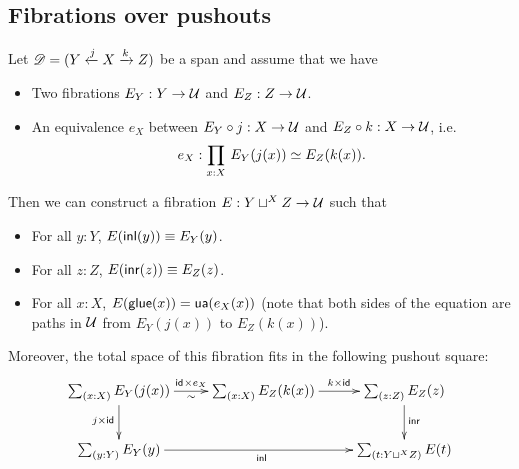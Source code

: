 \documentclass[hott-all.tex]{subfiles}
\begin{document}
\subsection{Fibrations over pushouts}
% 
% 
\begin{lem}
  Let $\mathscr{D}=(Y\xleftarrow{j}X\xrightarrow{k}Z)$ be a span and assume
  that we have
  \begin{itemize}
  \item Two fibrations $E_Y:Y\to\mathcal{U}$ and $E_Z:Z\to\mathcal{U}$.
  \item An equivalence $e_X$ between $E_Y\circ j:X\to\mathcal{U}$ and $E_Z\circ
    k:X\to\mathcal{U}$, i.e.
    \[e_X:\prd{x:X}\eqv{E_Y(j(x))}{E_Z(k(x))}.\]
  \end{itemize}

  Then we can construct a fibration $E:Y\sqcup^XZ\to\mathcal{U}$ such that
  \begin{itemize}
  \item For all $y:Y$, $E({\mathsf{inl}}(y))\equiv E_Y(y)$.
  \item For all $z:Z$, $E({\mathsf{inr}}(z))\equiv E_Z(z)$.
  \item For all $x:X$, ${E}\mathopen{}\left({\mathsf{glue}(x)}\right)\mathclose{}=\mathsf{ua}(e_X(x))$ (note that both sides of
    the equation are paths in $\mathcal{U}$ from $E_Y(j(x))$ to $E_Z(k(x))$).
  \end{itemize}
  Moreover, the total space of this fibration fits in the following pushout
  square:
  \[\xymatrix{ \sm{x:X}E_Y(j(x)) \ar[r]_\sim^{\idfunc\times e_X}
    \ar[d]_{j\times\idfunc} &
    \sm{x:X}E_Z(k(x)) \ar[r]^-{k\times\idfunc}
    & \sm{z:Z}E_Z(z) \ar[d]^\inr \\
    \sm{y:Y}E_Y(y) \ar[rr]_\inl & & \sm{t:Y\sqcup^XZ}E(t) }\]
\end{lem}
% 
\end{document}
